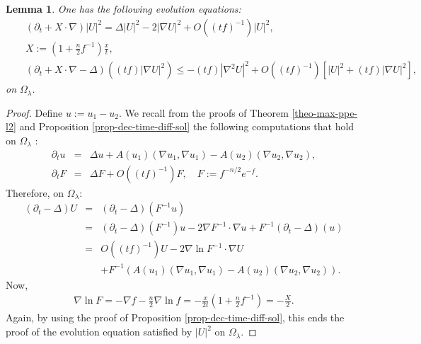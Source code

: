 \documentclass[a4paper,11pt,reqno]{amsart}
\newtheorem{lemma}[defn]{Lemma}
\begin{document}
\begin{lemma}\label{evo-equ-resc-vec-fiel}
One has the following evolution equations:
\begin{eqnarray}\label{evo-equ-resc-vec-fiel-1}
&&\left(\partial_t+X\cdot\nabla \right)|U|^2=\Delta |U|^2-2|\nabla U|^2 + \textit{O}\left((tf)^{-1}\right)|U|^2,\\
&&X:=\left(1+\frac{n}{2}f^{-1}\right)\frac{x}{t},\\
&&\left(\partial_t+X\cdot\nabla-\Delta \right)((tf)|\nabla U|^2)\leq-(tf)|\nabla^2U|^2+\textit{O}\left((tf)^{-1}\right)\left[|U|^2+(tf)|\nabla U|^2\right],\label{evo-equ-resc-vec-fiel-2}
\end{eqnarray}
on $\Omega_{\lambda}$.

\end{lemma}
\begin{proof}
Define $u:=u_1-u_2$.
We recall from the proofs of Theorem \ref{theo-max-ppe-l2} and Proposition \ref{prop-dec-time-diff-sol} the following computations that hold on $\Omega_{\lambda}$ :
\begin{eqnarray*}
\partial_tu&=&\Delta u+A(u_1)(\nabla u_1,\nabla u_1)-A(u_2)(\nabla u_2,\nabla u_2),\\
\partial_tF&=&\Delta F+\textit{O}\left((tf)^{-1}\right)F,\quad F:=f^{-n/2}e^{-f}.
\end{eqnarray*}
Therefore, on $\Omega_{\lambda}$:
\begin{eqnarray}
(\partial_t-\Delta)U&=&(\partial_t-\Delta)(F^{-1}u)\label{evo-equ-U-0}\\
&=&(\partial_t-\Delta)(F^{-1})u-2\nabla F^{-1}\cdot\nabla u+F^{-1}(\partial_t-\Delta)(u)\label{evo-equ-U-1}\\
&=&\textit{O}\left((tf)^{-1}\right)U-2\nabla \ln F^{-1}\cdot\nabla U\label{evo-equ-U-2}\\
&&+F^{-1}\left(A(u_1)(\nabla u_1,\nabla u_1)-A(u_2)(\nabla u_2,\nabla u_2)\right).\label{evo-equ-U-3}
\end{eqnarray}
Now,
\begin{eqnarray*}
\nabla \ln F=-\nabla f-\frac{n}{2}\nabla\ln f=-\frac{x}{2t}\left(1+\frac{n}{2}f^{-1}\right)=-\frac{X}{2}.
\end{eqnarray*}
Again, by using the proof of Proposition \ref{prop-dec-time-diff-sol}, this ends the proof of the evolution equation satisfied by $|U|^2$ on $\Omega_{\lambda}$.


\end{proof}
\end{document}
